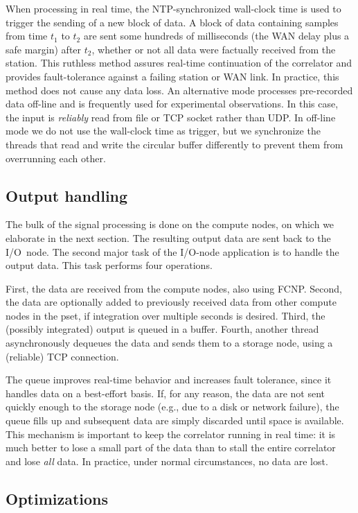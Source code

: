 \documentclass{sig-alternate}
\begin{document}
When processing in real time, the NTP-synchronized wall-clock time
is used to trigger the sending of a new block of data.
A block of data containing samples from time $t_1$ to $t_2$ are sent some hundreds
of milliseconds (the WAN delay plus a safe margin) after $t_2$, whether or
not all data were factually received from the station.
This ruthless method assures real-time continuation of the correlator and
provides fault-tolerance against a failing station or WAN link.
In practice, this method does not cause any data loss.
An alternative mode processes pre-recorded data off-line and is frequently used
for experimental observations.
In this case, the input is \emph{reliably} read from file or TCP socket rather than
UDP.
In off-line mode we do not use the wall-clock time as
trigger, but we synchronize the threads that read and write the circular
buffer differently to prevent them from overrunning each other.


\subsection{Output handling}

The bulk of the signal processing is done on the compute nodes, on which we
elaborate in the next section.
The resulting output data are sent back to the I/O~node.
The second major task of the I/O-node application is to handle the output data.
This task performs four operations.

First, the data are received from the compute nodes, also using FCNP.
Second, the data are optionally added to previously received data from other
compute nodes in the pset, if integration over multiple seconds is desired.
Third, the (possibly integrated) output is queued in a buffer.
Fourth, another thread asynchronously dequeues the data and sends them to
a storage node, using a (reliable) TCP connection.

The queue improves real-time behavior and increases fault tolerance, since
it handles data on a best-effort basis.
If, for any reason, the data are not sent quickly enough to the storage node
(e.g., due to a disk or network failure), the queue fills up and subsequent
data are simply discarded until space is available.
This mechanism is important to keep the correlator running in real
time: it is much better to lose a small part of the data than to stall the
entire correlator and lose \emph{all\/} data.
In practice, under normal circumstances, no data are lost.


\subsection{Optimizations}
\end{document}
